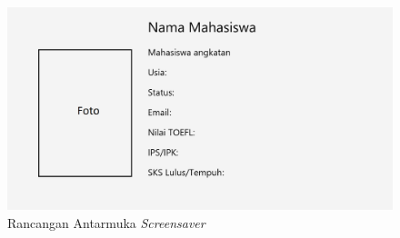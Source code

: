 \begin{figure}[H]
	\centering
	\includegraphics[scale=0.3]{Gambar/UI2.png}
	\caption{Rancangan Antarmuka \textit{Screensaver}}
	\label{fig:4_antarmuka}
\end{figure}